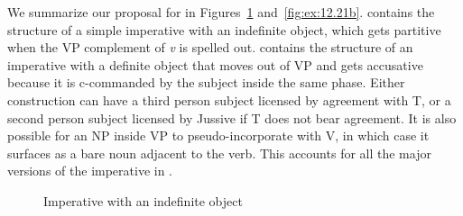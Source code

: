 \documentclass[output=paper]{langsci/langscibook}
\begin{document}
We summarize our proposal for   in
Figures~\ref{fig:ex:12.21a} and~\ref{fig:ex:12.21b}.  contains the structure of a simple
imperative with an indefinite object, which gets partitive when the VP
complement of \emph{v}\textsubscript{\Imp} is spelled
out.  contains the structure of an imperative with a definite
object that moves out of VP and gets accusative because it is c-commanded by
the subject inside the same phase.  Either construction can have a
third person subject licensed by agreement with T, or a second person subject
licensed by Jussive if T does not bear agreement.  It is also possible for an NP
inside VP to pseudo-incorporate with V, in which case it surfaces as a bare
noun adjacent to the verb.  This accounts for all the major versions of the
imperative in .

\begin{figure}
    \caption{Imperative with an indefinite object\label{fig:ex:12.21a}}
\end{figure}
\end{document}
